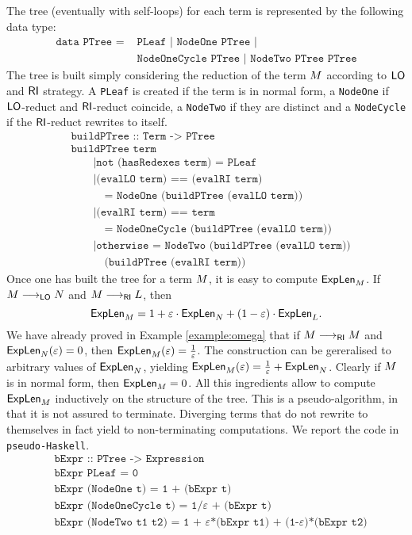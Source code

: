 The tree (eventually with self-loops) for each term is represented by the following data type:
\begin{align*}
	\texttt{data PTree = }&\texttt{PLeaf | NodeOne PTree |}\\
	&\texttt{NodeOneCycle PTree | NodeTwo PTree PTree}
\end{align*}
The tree is built simply considering the reduction of the term $M$ according to $\textsf{LO}$ and $\textsf{RI}$ strategy. A \texttt{PLeaf} is created if the term is in normal form, a \texttt{NodeOne} if $\textsf{LO}$-reduct and $\textsf{RI}$-reduct coincide, a \texttt{NodeTwo} if they are distinct and a \texttt{NodeCycle} if the $\textsf{RI}$-reduct rewrites to itself.
\begin{align*}
&\texttt{buildPTree :: Term -> PTree}\\
&\texttt{buildPTree term}\\
&\qquad\texttt{|not (hasRedexes term) = PLeaf}\\
&\qquad\texttt{|(evalLO term) == (evalRI term)}\\
&\quad\qquad\texttt{= NodeOne (buildPTree (evalLO term))}\\
&\qquad\texttt{|(evalRI term) == term}\\
&\qquad\quad\texttt{= NodeOneCycle (buildPTree (evalLO term))}\\
&\qquad\texttt{|otherwise = NodeTwo (buildPTree (evalLO term))}\\
&\qquad\quad\texttt{(buildPTree (evalRI term))}
\end{align*}
Once one has built the tree for a term $M$, it is easy to compute $\textsf{ExpLen}_{M}$. If $M\longrightarrow_{\textsf{LO}}N$ and $M\longrightarrow_{\textsf{RI}}L$, then
$$
\textsf{ExpLen}_{M}=1+\varepsilon\cdot\textsf{ExpLen}_{N}+(1-\varepsilon)\cdot\textsf{ExpLen}_{L}.
$$
We have already proved in Example \ref{example:omega} that if $M\longrightarrow_{\textsf{RI}}M$ and $\textsf{ExpLen}_{N}(\varepsilon)=0$, then $\textsf{ExpLen}_{M}(\varepsilon)=\frac{1}{\varepsilon}$. The construction can be gereralised to arbitrary values of $\textsf{ExpLen}_{N}$, yielding $\textsf{ExpLen}_{M}(\varepsilon)=\frac{1}{\varepsilon}+\textsf{ExpLen}_{N}$. Clearly if $M$ is in normal form, then $\textsf{ExpLen}_{M}=0$. All this ingredients allow to compute $\textsf{ExpLen}_{M}$ inductively on the structure of the tree. This is a pseudo-algorithm, in that it is not assured to terminate. Diverging terms that do not rewrite to themselves in fact yield to non-terminating computations. We report the code in \texttt{pseudo-Haskell}.
\begin{align*}
&\texttt{bExpr :: PTree -> Expression}\\
&\texttt{bExpr PLeaf = 0}\\
&\texttt{bExpr (NodeOne t) = 1 + (bExpr t)}\\
&\texttt{bExpr (NodeOneCycle t) = 1/}\varepsilon\texttt{ + (bExpr t)}\\
&\texttt{bExpr (NodeTwo t1 t2) = 1 + }\varepsilon\texttt{*(bExpr t1) + (1-}\varepsilon\texttt{)*(bExpr t2)}
\end{align*}
